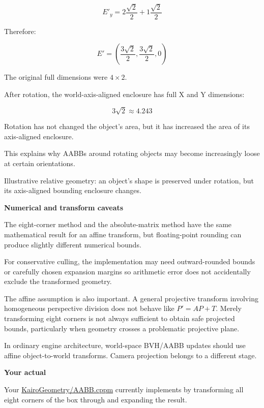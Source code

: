 \[
E'_y=2\frac{\sqrt2}{2}+1\frac{\sqrt2}{2}
\]

Therefore:

\[
\boxed{ E'=\left(\frac{3\sqrt2}{2},\frac{3\sqrt2}{2},0\right) }
\]

The original full dimensions were \(4\times2\).

After rotation, the world-axis-aligned enclosure has full X and Y dimensions:

\[
3\sqrt2\approx4.243
\]

Rotation has not changed the object's area, but it has increased the area of its axis-aligned enclosure.

This explains why AABBs around rotating objects may become increasingly loose at certain orientations.

Illustrative relative geometry: an object's shape is preserved under rotation, but its axis-aligned bounding enclosure changes.

\textbf{Numerical and transform caveats}

The eight-corner method and the absolute-matrix method have the same mathematical result for an affine transform, but floating-point rounding can produce slightly different numerical bounds.

For conservative culling, the implementation may need outward-rounded bounds or carefully chosen expansion margins so arithmetic error does not accidentally exclude the transformed geometry.

The affine assumption is also important. A general projective transform involving homogeneous perspective division does not behave like \(P'=AP+T\). Merely transforming eight corners is not always sufficient to obtain safe projected bounds, particularly when geometry crosses a problematic projective plane.

In ordinary engine architecture, world-space BVH/AABB updates should use affine object-to-world transforms. Camera projection belongs to a different stage.

\textbf{Your actual }

Your \href{https://github.com/swayam8624/KairoGeometry/blob/master/AABB.cppm?utm_source=chatgpt.com}{KairoGeometry/AABB.cppm} currently implements  by transforming all eight corners of the box through  and expanding the result.

